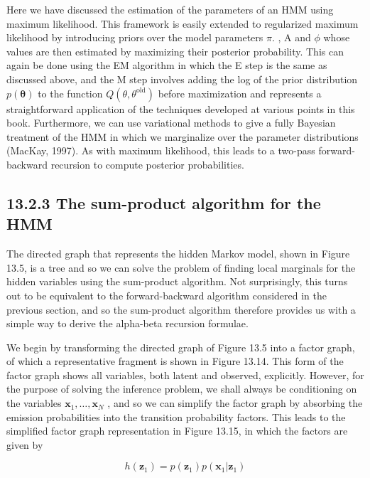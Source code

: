 \documentclass[
  10
]{article}
\begin{document}
Here we have discussed the estimation of the parameters of an HMM using
maximum likelihood. This framework is easily extended to regularized
maximum likelihood by introducing priors over the model parameters
\(\pi .\) , A and \(\phi\) whose values are then estimated by maximizing
their posterior probability. This can again be done using the EM
algorithm in which the E step is the same as discussed above, and the M
step involves adding the log of the prior distribution
\(p ( \pmb \theta )\) to the function
\(Q ( \theta , \theta ^ { \mathrm { o l d } } )\) before maximization
and represents a straightforward application of the techniques developed
at various points in this book. Furthermore, we can use variational
methods to give a fully Bayesian treatment of the HMM in which we
marginalize over the parameter distributions (MacKay, 1997). As with
maximum likelihood, this leads to a two-pass forward-backward recursion
to compute posterior probabilities.

\subsection{13.2.3 The sum-product algorithm for the
HMM}\label{the-sum-product-algorithm-for-the-hmm}

The directed graph that represents the hidden Markov model, shown in
Figure 13.5, is a tree and so we can solve the problem of finding local
marginals for the hidden variables using the sum-product algorithm. Not
surprisingly, this turns out to be equivalent to the forward-backward
algorithm considered in the previous section, and so the sum-product
algorithm therefore provides us with a simple way to derive the
alpha-beta recursion formulae.

We begin by transforming the directed graph of Figure 13.5 into a factor
graph, of which a representative fragment is shown in Figure 13.14. This
form of the factor graph shows all variables, both latent and observed,
explicitly. However, for the purpose of solving the inference problem,
we shall always be conditioning on the variables
\(\mathbf { x } _ { 1 } , \ldots , \mathbf { x } _ { N }\) , and so we
can simplify the factor graph by absorbing the emission probabilities
into the transition probability factors. This leads to the simplified
factor graph representation in Figure 13.15, in which the factors are
given by

\[
{h (\mathbf {z} _ {1})} = {p (\mathbf {z} _ {1}) p (\mathbf {x} _ {1} | \mathbf {z} _ {1})}\tag{13.45}
\]
\end{document}
